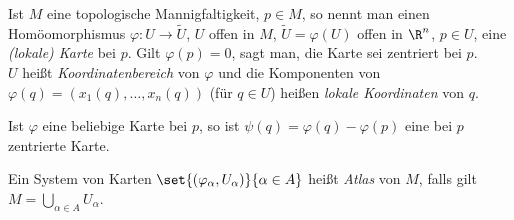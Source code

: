 \begin{defn}
	\begin{notat*}
		Ist $M$ eine topologische Mannigfaltigkeit, $p \in M$, so nennt man einen Homöomorphismus $\varphi: U \to \tilde{U}$, $U$ offen in $M$, $\tilde{U} = \varphi(U)$ offen in $\R^n$, $p \in U$, eine \emph{(lokale) Karte} bei $p$. Gilt $ \varphi(p) = 0 $, sagt man, die Karte sei zentriert bei $p$.\\
		$U$ heißt \emph{Koordinatenbereich} von $\varphi$ und die Komponenten von $\varphi(q) = (x_1(q),\dots,x_n(q))$ (für $q \in U$) heißen \emph{lokale Koordinaten} von $q$.
		\begin{rem*}
			Ist $\varphi$ eine beliebige Karte bei $p$, so ist $\psi(q) = \varphi(q) - \varphi(p)$ eine bei $p$ zentrierte Karte.
		\end{rem*}
	\end{notat*}
	Ein System von Karten $ \set{(\varphi_\alpha,U_\alpha)}{\alpha \in A} $ heißt \emph{Atlas} von $M$, falls gilt $ M = \bigcup\limits_{\alpha \in A} U_\alpha $.
\end{defn}

